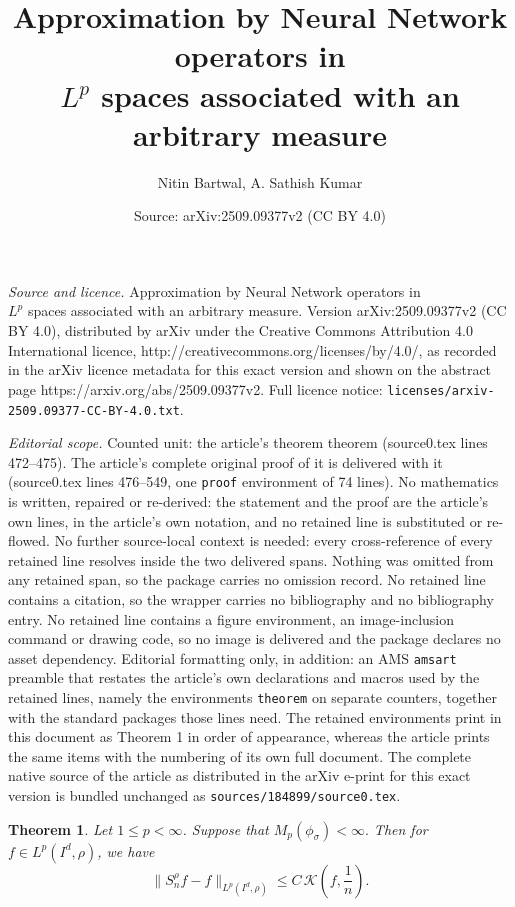 \documentclass[10pt,a4paper]{amsart}
\title{Approximation by Neural Network operators in\\ $L^p$ spaces associated with an arbitrary measure}
\author{Nitin Bartwal, A. Sathish Kumar}
\date{Source: arXiv:2509.09377v2 (CC BY 4.0)}
\newtheorem{theorem}{Theorem}
\newcommand{\LP}{L^p(I^d, \rho)}
\begin{document}
\maketitle

\noindent\emph{Source and licence.} Approximation by Neural Network operators in\\ $L^p$ spaces associated with an arbitrary measure. Version arXiv:2509.09377v2 (CC BY 4.0), distributed by arXiv under the Creative Commons Attribution 4.0 International licence, http://creativecommons.org/licenses/by/4.0/, as recorded in the arXiv licence metadata for this exact version and shown on the abstract page https://arxiv.org/abs/2509.09377v2. Full licence notice: \texttt{licenses/arxiv-2509.09377-CC-BY-4.0.txt}.\par\smallskip

\noindent\textit{Editorial scope.} Counted unit: the article's theorem theorem (source0.tex lines 472--475). The article's complete original proof of it is delivered with it (source0.tex lines 476--549, one \texttt{proof} environment of 74 lines). No mathematics is written, repaired or re-derived: the statement and the proof are the article's own lines, in the article's own notation, and no retained line is substituted or re-flowed.  No further source-local context is needed: every cross-reference of every retained line resolves inside the two delivered spans.  Nothing was omitted from any retained span, so the package carries no omission record.  No retained line contains a citation, so the wrapper carries no bibliography and no bibliography entry.  No retained line contains a figure environment, an image-inclusion command or drawing code, so no image is delivered and the package declares no asset dependency.  Editorial formatting only, in addition: an AMS \texttt{amsart} preamble that restates the article's own declarations and macros used by the retained lines, namely the environments \texttt{theorem} on separate counters, together with the standard packages those lines need.  The retained environments print in this document as Theorem 1 in order of appearance, whereas the article prints the same items with the numbering of its own full document.  The complete native source of the article as distributed in the arXiv e-print for this exact version is bundled unchanged as \texttt{sources/184899/source0.tex}.
\begin{theorem} 
    Let $1\leq p<\infty$. Suppose that $M_p(\phi_\sigma)<\infty.$ Then for $f\in \LP$, we have
    $$\|S^{\rho}_nf-f\|_{\LP}\leq C\,\mathcal{K}\left(f,\frac{1}{n}\right). $$
\end{theorem}
\end{document}
